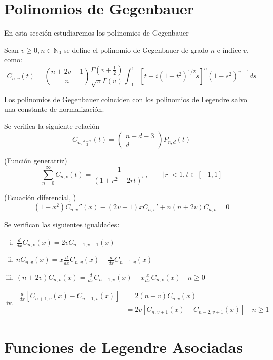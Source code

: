 \chapter{Polinomios de Gegenbauer}\label{aped.D}
En esta sección estudiaremos los polinomios de Gegenbauer \cite[sec. 2.9]{libro_esfarm}
\begin{defn}Sean $v\ge 0,n\in\mathds{N}_0$ se define el polinomio de Gegenbauer de grado $n$ e índice $v$, como:
	$$C_{n,v}(t) = \binom{n+2v-1}{n}\frac{\Gamma(v+\frac{1}{2})}{\sqrt{\pi}\Gamma(v)}\int_{-1}^{1}\left[t+i(1-t^2)^{1/2}s\right]^n (1-s^2)^{v-1} ds$$ 
\end{defn}
Los polinomios de Gegenbauer coinciden con los polinomios de Legendre salvo una constante de normalización.
\begin{prop}\label{geb_rel}Se verifica la siguiente relación
	$$C_{n,\frac{d-2}{2}}(t) = \begin{pmatrix}
	n+d-3 \\
	d
	\end{pmatrix} P_{n,d}(t)
	$$
\end{prop}
\begin{prop}(Función generatriz)$$
	\sum_{n=0}^{\infty} C_{n,v}(t) = \frac{1}{(1+r^2-2rt)^v}, \qquad |r|<1, t\in[-1,1]$$
\end{prop}
\begin{prop}\label{Ggdif}(Ecuación diferencial, \cite[sec 4.7]{libro_gegen})
	$$
	(1-x^2)C_{n,v}''(x)-(2v+1)xC_{n,v}'+n(n+2v)C_{n,v} = 0
	$$
\end{prop}
\begin{prop}\label{propGg} Se verifican las siguientes igualdades:
	\begin{enumerate}[(i)]
	\item $\frac{d}{dx} C_{n,v}(x) = 2v C_{n-1,v+1}(x)$
	\item $nC_{n,v}(x) = x\frac{d}{dx} C_{n,v}(x) - \frac{d}{dx} C_{n-1,v}(x)$
	\item $(n+2v) C_{n,v}(x)  = \frac{d}{dx}C_{n-1,v}(x)-x \frac{x}{dx}C_{n,v}(x) \quad n\ge 0$
	\item $\begin{aligned}
		\frac{d}{dx} \left[C_{n+1,v}(x) - C_{n-1,v}(x)\right]  &= 2(n+v)C_{n,v}(x)\\ &= 2v \left[C_{n,v+1}(x) - C_{n-2,v+1}(x)\right] \quad n\ge 1
	\end{aligned}$        	
\end{enumerate}
\end{prop}
\chapter{Funciones de Legendre Asociadas}\label{aped.E}

